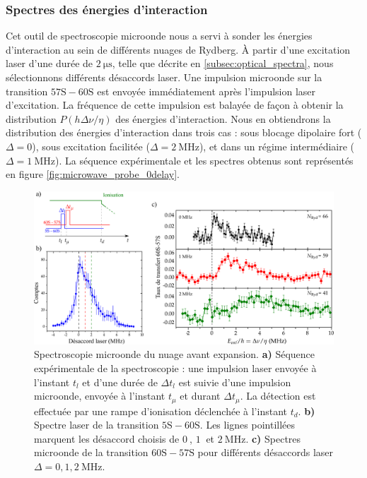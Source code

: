 	\subsubsection*{Spectres des énergies d'interaction}
\noindent Cet outil de spectroscopie microonde nous a servi à sonder les énergies d'interaction au sein de différents nuages de Rydberg.
\`A partir d'une excitation laser d'une durée de $\SI{2}{\us}$, telle que décrite en \ref{subsec:optical_spectra}, nous sélectionnons différents désaccords laser.
Une impulsion microonde sur la transition $\mathrm{57S-60S}$ est envoyée immédiatement après l'impulsion laser d'excitation.
La fréquence de cette impulsion est balayée de façon à obtenir la distribution $P(h\Delta\nu/\eta)$ des énergies d'interaction.
Nous en obtiendrons la distribution des énergies d'interaction dans trois cas  : sous blocage dipolaire fort ($\Delta = 0$), sous excitation facilitée ($\Delta = \SI{2}{\MHz}$), et dans un régime intermédiaire ($\Delta = \SI{1}{\MHz}$).
La séquence expérimentale et les spectres obtenus sont représentés en figure \eqref{fig:microwave_probe_0delay}.

\begin{figure}[h]
\centering
\includegraphics[width=\linewidth]{figures/low_l/microwave_probe_0delay_wide}
\caption[Spectroscopie microonde du nuage avec expansion]{
Spectroscopie microonde du nuage avant expansion.
\textbf{a)} Séquence expérimentale de la spectroscopie : une impulsion laser envoyée à l'instant $t_l$ et d'une durée de $\Delta t_l$ est suivie d'une impulsion microonde, envoyée à l'instant $t_\mu$ et durant $\Delta t_\mu$.
La détection est effectuée par une rampe d'ionisation déclenchée à l'instant $t_d$.
\textbf{b)} Spectre laser de la transition $\mathrm{5S-60S}$. Les lignes pointillées marquent les désaccord choisis de $\SI{0}{}$, $\SI{1}{}$ et $\SI{2}{\MHz}$.
\textbf{c)} Spectres microonde de la transition $\mathrm{60S-57S}$ pour différents désaccords laser $\Delta = 0, 1 , \SI{2}{\MHz}$.
}
\label{fig:microwave_probe_0delay}
\end{figure}

